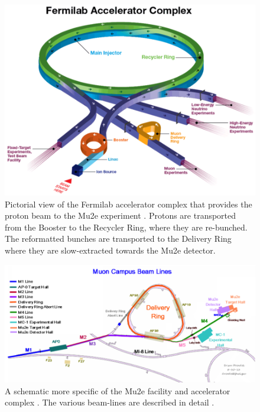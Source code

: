 \documentclass[12pt,a4paper,openright, oneside, titlepage]{book} %
\begin{document}
\begin{figure}[h!]
\centering
\includegraphics[scale=0.5]{ProtonBeamlineArial_3D}
\caption[Fermilab accelerator complex]{Pictorial view of the Fermilab accelerator complex that provides the proton beam to the Mu2e experiment \cite{FNAL}. 
Protons are transported from the Booster to the Recycler Ring, where they are re-bunched. 
The reformatted bunches are transported to the Delivery Ring where they are slow-extracted towards the Mu2e detector.}
\label{_ProtonBeamlineArial}
\end{figure}

\begin{figure}[h!]
\centering
\includegraphics[scale=0.7]{ProtonBeamlineArial_sketch}
\caption[Mu2e delivery system]{A schematic more specific of the Mu2e facility and accelerator complex \cite{MTDR}. 
The various beam-lines are described in detail \cite{MTDR}.}
\label{_ProtonBeamlineArial_sketch}
\end{figure}
\end{document}
